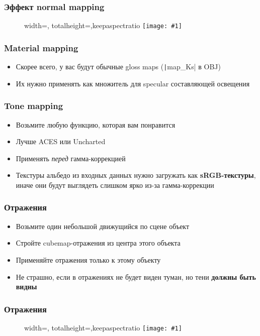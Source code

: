 \documentclass[10pt]{beamer}
\newcommand{\slideimage}[1]{
  \begin{figure}
    \begin{adjustbox}{width=\textwidth, totalheight=\textheight-2\baselineskip-2\baselineskip,keepaspectratio}
      \texttt{[image: \#1]}
    \end{adjustbox}
  \end{figure}
}
\begin{document}
\begin{frame}[fragile]
\frametitle{Эффект normal mapping}
\slideimage{normal_map.png}
\end{frame}

\begin{frame}[fragile]
\frametitle{Material mapping}
\begin{itemize}
\item Скорее всего, у вас будут обычные gloss maps (\texttt|map_Ks| в OBJ)
\pause
\item Их нужно применять как множитель для specular составляющей освещения
\end{itemize}
\end{frame}

\begin{frame}[fragile]
\frametitle{Tone mapping}
\begin{itemize}
\item Возьмите любую функцию, которая вам понравится
\pause
\item Лучше ACES или Uncharted
\pause
\item Применять \textit{перед} гамма-коррекцией
\pause
\item Текстуры альбедо из входных данных нужно загружать как \textbf{sRGB-текстуры}, иначе они будут выглядеть слишком ярко из-за гамма-коррекции
\end{itemize}
\end{frame}

\begin{frame}[fragile]
\frametitle{Отражения}
\begin{itemize}
\item Возьмите один небольшой движущийся по сцене объект
\pause
\item Стройте cubemap-отражения из центра этого объекта
\pause
\item Применяйте отражения только к этому объекту
\pause
\item Не страшно, если в отражениях не будет виден туман, но тени \textbf{должны быть видны}
\end{itemize}
\end{frame}

\begin{frame}[fragile]
\frametitle{Отражения}
\slideimage{reflection.png}
\end{frame}
\end{document}
